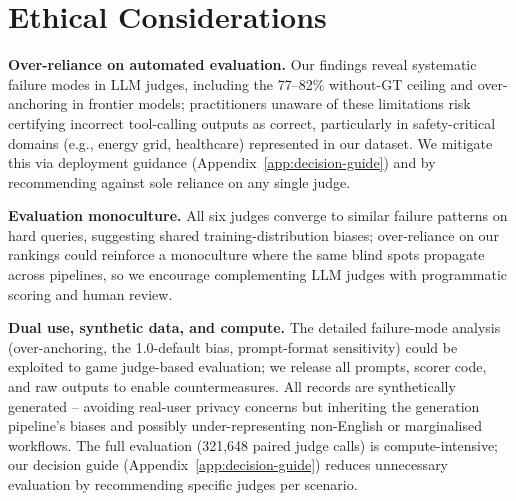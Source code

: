 \section*{Ethical Considerations}

\textbf{Over-reliance on automated evaluation.}
Our findings reveal systematic failure modes in LLM judges, including the 77--82\% without-GT ceiling and over-anchoring in frontier models; practitioners unaware of these limitations risk certifying incorrect tool-calling outputs as correct, particularly in safety-critical domains (e.g., energy grid, healthcare) represented in our dataset. We mitigate this via deployment guidance (Appendix~\ref{app:decision-guide}) and by recommending against sole reliance on any single judge.

\textbf{Evaluation monoculture.} All six judges converge to similar failure patterns on hard queries, suggesting shared training-distribution biases; over-reliance on our rankings could reinforce a monoculture where the same blind spots propagate across pipelines, so we encourage complementing LLM judges with programmatic scoring and human review.

\textbf{Dual use, synthetic data, and compute.} The detailed failure-mode analysis (over-anchoring, the 1.0-default bias, prompt-format sensitivity) could be exploited to game judge-based evaluation; we release all prompts, scorer code, and raw outputs to enable countermeasures. All records are synthetically generated -- avoiding real-user privacy concerns but inheriting the generation pipeline's biases and possibly under-representing non-English or marginalised workflows. The full evaluation (321,648 paired judge calls) is compute-intensive; our decision guide (Appendix~\ref{app:decision-guide}) reduces unnecessary evaluation by recommending specific judges per scenario.
